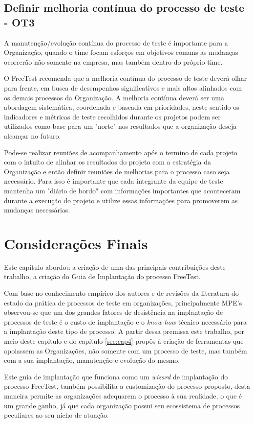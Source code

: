 \subsection{Definir melhoria contínua do processo de teste - OT3}

A manutenção/evolução contínua do processo de teste é importante para a Organização, quando o time focam esforços em objetivos comuns as mudanças ocorrerão não somente na empresa, mas também dentro do próprio time.

O FreeTest recomenda que a melhoria contínua do processo de teste deverá olhar para frente, em busca de desempenhos significativos e mais altos alinhados com os demais processos da Organização. A melhoria contínua deverá ser uma abordagem sistemática, coordenada e baseada em prioridades, neste sentido os indicadores e métricas de teste recolhidos durante os projetos podem ser utilizados como base para um "norte" nos resultados que a organização deseja alcançar no futuro.

Pode-se realizar reuniões de acompanhamento após o termino de cada projeto com o intuito de alinhar os resultados do projeto com a estratégia da Organização e então definir reuniões de melhorias para o processo caso seja necessário. Para isso é importante que cada integrante da equipe de teste mantenha um "diário de bordo" com informações importantes que aconteceram durante a execução do projeto e utilize essas informações para promoverem as mudanças necessárias.

\section{Considerações Finais}
\label{sec:consideracoesfinaisguiaimplantacao}

Este capítulo abordou a criação de uma das principais contribuições deste trabalho, a criação do Guia de Implantação do processo FreeTest. 

Com base no conhecimento empírico dos autores e de revisões da literatura do estado da prática de processos de teste em organizações, principalmente MPE’s observou-se que um dos grandes fatores de desistência na implantação de processos de teste é o custo de implantação e o \textit{know-how} técnico necessário para a implantação deste tipo de processo. A partir dessa premissa este trabalho, por meio deste capítulo e do capítulo \ref{sec:cap4} propôs à criação de ferramentas que apoiassem as Organizações, não somente com um processo de teste, mas também com a sua implantação, manutenção e evolução do mesmo. 

Este guia de implantação que funciona como um \textit{wizard} de implantação do processo FreeTest, também possibilita a customização do processo proposto, desta maneira permite as organizações adequarem o processo à sua realidade, o que é um grande ganho, já que cada organização possui seu ecossistema de processos peculiares ao seu nicho de atuação. 